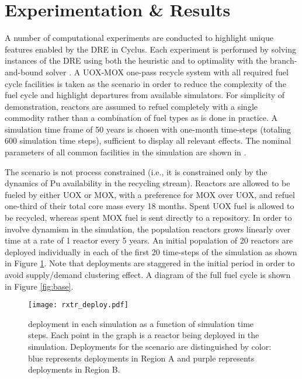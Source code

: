 \section{Experimentation \& Results}\label{sec:results}


A number of computational experiments are conducted to highlight unique features
enabled by the DRE in Cyclus. Each experiment is performed by solving instances
of the DRE using both the \greedy heuristic and to optimality with the
branch-and-bound solver \cbc. A UOX-MOX one-pass recycle system with all
required fuel cycle facilities is taken as the \basecase scenario in order to
reduce the complexity of the fuel cycle and highlight departures from available
simulators. For simplicity of demonstration, reactors are assumed to refuel
completely with a single commodity rather than a combination of fuel types as is
done in practice. A simulation time frame of 50 years is chosen with one-month
time-steps (totaling 600 simulation time steps), sufficient to display all
relevant effects. The nominal parameters of all common facilities in the
simulation are shown in \cite{gidden_dre_2016}.

The \basecase scenario is not process constrained (i.e., it is constrained only
by the dynamics of Pu availability in the recycling stream). Reactors are
allowed to be fueled by either UOX or MOX, with a preference for MOX over UOX,
and refuel one-third of their total core mass every 18 months. Spent UOX fuel is
allowed to be recycled, whereas spent MOX fuel is sent directly to a
repository. In order to involve dynamism in the simulation, the population
reactors grows linearly over time at a rate of 1 reactor every 5 years. An
initial population of 20 reactors are deployed individually in each of the first
20 time-steps of the simulation as shown in Figure \ref{fig:deploy}. Note that
deployments are staggered in the initial period in order to avoid supply/demand
clustering effect. A diagram of the full \basecase fuel cycle is shown in Figure
\ref{fig:base}.

\begin{figure}
  \begin{center}
    \texttt{[image: rxtr\_deploy.pdf]}
    \caption[]{
      \label{fig:deploy}
      \reactor deployment in each simulation as a function of simulation time
      steps. Each point in the graph is a reactor being deployed in the
      simulation. Deployments for the \tariff scenario are distinguished by
      color: blue represents deployments in Region A and purple represents
      deployments in Region B.}
  \end{center}
\end{figure}

